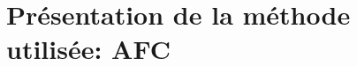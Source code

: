 \documentclass{article}
\begin{document}
\section{Présentation de la méthode utilisée: AFC}


\end{document}
